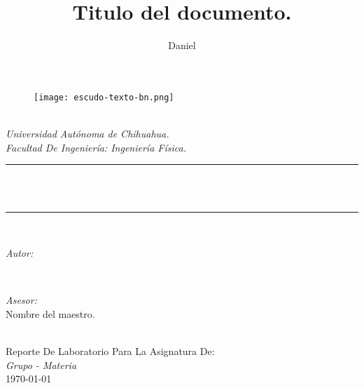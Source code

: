 \documentclass[12pt]{article}
\title{Titulo del documento.}
\author{\textup{Daniel}}
\begin{document}
\newtheorem{theorem}{Theorem}[section]
 
\newlength{\PageFrameTopMargin}
\newlength{\PageFrameBottomMargin}
\newlength{\PageFrameLeftMargin}
\newlength{\PageFrameRightMargin}

\setlength{\PageFrameTopMargin}{1.0cm}
\setlength{\PageFrameBottomMargin}{1.0cm}
\setlength{\PageFrameLeftMargin}{1.0cm}
\setlength{\PageFrameRightMargin}{1.0cm}
\makeatletter

\newlength{\Page@FrameHeight}
\newlength{\Page@FrameWidth}

\AddToShipoutPicture{
  \thinlines
  \setlength{\Page@FrameHeight}{\paperheight-\PageFrameTopMargin-\PageFrameBottomMargin}
  \setlength{\Page@FrameWidth}{\paperwidth-\PageFrameLeftMargin-\PageFrameRightMargin}
  \put(\strip@pt\PageFrameLeftMargin,\strip@pt\PageFrameTopMargin){
    \framebox(\strip@pt\Page@FrameWidth, \strip@pt\Page@FrameHeight){}}}

\makeatother
%

\begin{titlepage}
	\newcommand{\HRule}{\rule{\linewidth}{0.5mm}}
	\begin{figure}
		\centering
		\texttt{[image: escudo-texto-bn.png]}
	\end{figure}
	\centering 
	\quad\\[1.5cm]
	\textsl{\Large Universidad Autónoma de Chihuahua.}\\[0.5cm] 
	\textsl{\large Facultad De Ingeniería: Ingeniería Física.}\\[0.5cm] 
	\makeatletter
	\HRule \\[0.4cm]
	{ \huge \bfseries \@title}\\[0.4cm] 
	\HRule \\[1.5cm]
	\begin{minipage}{0.4\textwidth}
		\begin{flushleft} \large
			\emph{Autor:}\\
			\@author 
		\end{flushleft}
	\end{minipage}
	~
	\begin{minipage}{0.4\textwidth}
		\begin{flushright} \large
			\emph{Asesor:} \\
			\textup{Nombre del maestro.}
		\end{flushright}
	\end{minipage}\\[3cm]
	\makeatother
	{\large Reporte De Laboratorio Para La Asignatura De:}\\[0.5cm]
	{\large \emph{Grupo - Materia}}\\[0.5cm]
	{\large \today}\\[2cm] 
	\vfill 
\end{titlepage}
 
\end{document}
